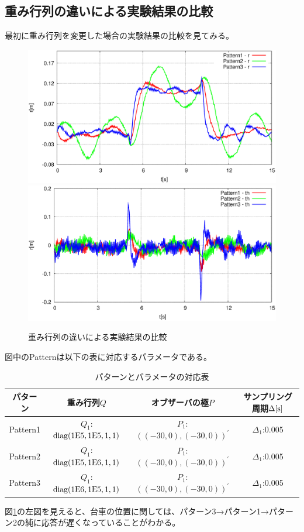 	\subsection{重み行列の違いによる実験結果の比較}
	最初に重み行列を変更した場合の実験結果の比較を見てみる。
	\begin{figure}[H]
		\centering
		\includegraphics[width=0.49\linewidth]{gazo/Compare_Q_R2.eps}
		\includegraphics[width=0.49\linewidth]{gazo/Compare_Q_TH2.eps}
		\caption{重み行列の違いによる実験結果の比較}
		\label{image:comp_Q}
	\end{figure}
	図中のPatternは以下の表に対応するパラメータである。
	\begin{table}[H]
		\begin{center}
			\caption{パターンとパラメータの対応表}
			\medskip
			
			\begin{tabular}{|c|c|c|c|}\hline
				パターン & 重み行列$Q$ & オブザーバの極$P$ & サンプリング周期$\Delta[\rm{s}]$ \\ \hline\hline
				Pattern1 & $Q_1$:$\rm{diag}(1E5,1E5,1,1)$ & $P_1$:$((-30,0),(-30,0))^{'}$ & $\Delta_1$:0.005 \\ \hline
				Pattern2 & $Q_1$:$\rm{diag}(1E5,1E6,1,1)$ & $P_1$:$((-30,0),(-30,0))^{'}$ & $\Delta_1$:0.005 \\ \hline
				Pattern3 & $Q_1$:$\rm{diag}(1E6,1E5,1,1)$ & $P_1$:$((-30,0),(-30,0))^{'}$ & $\Delta_1$:0.005 \\ \hline
			\end{tabular}
		\end{center}
		\label{table:huriage_control}
	\end{table}
	図\ref{image:comp_Q}の左図を見えると、台車の位置に関しては、パターン3→パターン1→パターン2の純に応答が遅くなっていることがわかる。
